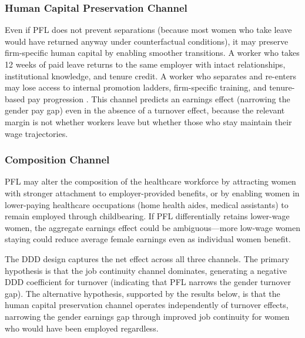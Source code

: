 \documentclass[12pt]{article}
\begin{document}
\subsubsection*{Human Capital Preservation Channel} Even if PFL does not prevent separations (because most women who take leave would have returned anyway under counterfactual conditions), it may preserve firm-specific human capital by enabling smoother transitions. A worker who takes 12 weeks of paid leave returns to the same employer with intact relationships, institutional knowledge, and tenure credit. A worker who separates and re-enters may lose access to internal promotion ladders, firm-specific training, and tenure-based pay progression \citep{goldin2014}. This channel predicts an earnings effect (narrowing the gender pay gap) even in the absence of a turnover effect, because the relevant margin is not whether workers leave but whether those who stay maintain their wage trajectories.

\subsubsection*{Composition Channel} PFL may alter the composition of the healthcare workforce by attracting women with stronger attachment to employer-provided benefits, or by enabling women in lower-paying healthcare occupations (home health aides, medical assistants) to remain employed through childbearing. If PFL differentially retains lower-wage women, the aggregate earnings effect could be ambiguous---more low-wage women staying could reduce average female earnings even as individual women benefit.

The DDD design captures the net effect across all three channels. The primary hypothesis is that the job continuity channel dominates, generating a negative DDD coefficient for turnover (indicating that PFL narrows the gender turnover gap). The alternative hypothesis, supported by the results below, is that the human capital preservation channel operates independently of turnover effects, narrowing the gender earnings gap through improved job continuity for women who would have been employed regardless.
\end{document}
